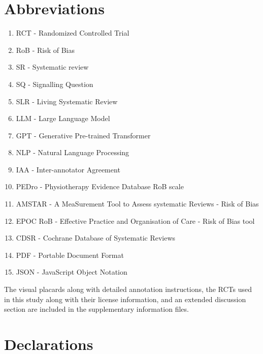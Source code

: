 \documentclass[sn-mathphys,Numbered]{sn-jnl}%
\theoremstyle{thmstyleone}%
\theoremstyle{thmstyletwo}%
\theoremstyle{thmstylethree}%
\begin{document}
\section{Abbreviations}%
%
\begin{enumerate}
    \item RCT - Randomized Controlled Trial
    \item RoB - Risk of Bias
    \item SR - Systematic review
    \item SQ - Signalling Question
    \item SLR - Living Systematic Review
    \item LLM - Large Language Model
    \item GPT - Generative Pre-trained Transformer
    \item NLP - Natural Language Processing
    \item IAA - Inter-annotator Agreement
    \item PEDro - Physiotherapy Evidence Database RoB scale
    \item AMSTAR - A MeaSurement Tool to Assess systematic Reviews - Risk of Bias
    \item EPOC RoB - Effective Practice and Organisation of Care - Risk of Bias tool
    \item CDSR - Cochrane Database of Systematic Reviews
    \item PDF - Portable Document Format
    \item JSON - JavaScript Object Notation
\end{enumerate}
%
%
%
\backmatter

%
The visual placards along with detailed annotation instructions, the RCTs used in this study along with their license information, and an extended discussion section are included in the supplementary information files.
%
%
%


%
%
%
\section*{Declarations}
%
\end{document}
